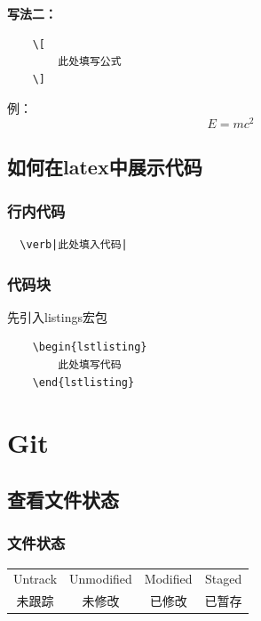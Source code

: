 \documentclass[UTF8,a4paper]{ctexart}
\begin{document}
\textbf{写法二：}
\begin{lstlisting}
    \[
        此处填写公式
    \]
\end{lstlisting}
\qquad 例：
\[
    E=mc^2
\]

\subsection{如何在latex中展示代码} 
\subsubsection{行内代码} 
\begin{lstlisting}
  \verb|此处填入代码|
\end{lstlisting}

\subsubsection{代码块} 
先引入listings宏包
\begin{Verbatim}
    \begin{lstlisting}
        此处填写代码
    \end{lstlisting}
\end{Verbatim}


\newpage
\section{Git}
\subsection{查看文件状态}
\subsubsection{文件状态}
\begin{table}[H]
    \centering
    \begin{tabular}{|c|c|c|c|}
        \hline
        Untrack & Unmodified & Modified & Staged\\
        未跟踪 & 未修改 & 已修改 & 已暂存\\
        \hline
    \end{tabular}
\end{table}
\end{document}
